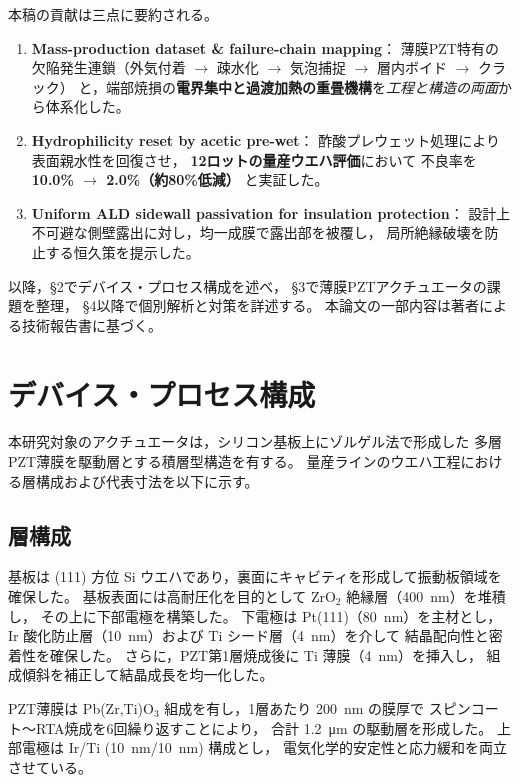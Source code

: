 \documentclass[conference]{IEEEtran}
\begin{document}
本稿の貢献は三点に要約される。
\begin{enumerate}
  \item \textbf{Mass-production dataset \& failure-chain mapping}：  
  薄膜PZT特有の欠陥発生連鎖（外気付着 $\rightarrow$ 疎水化 $\rightarrow$ 気泡捕捉 $\rightarrow$ 層内ボイド $\rightarrow$ クラック）
  と，端部焼損の\textbf{電界集中と過渡加熱の重畳機構}を\emph{工程と構造の両面}から体系化した。
  \item \textbf{Hydrophilicity reset by acetic pre-wet}：  
  酢酸プレウェット処理により表面親水性を回復させ，
  \textbf{12ロットの量産ウエハ評価}において
  不良率を \textbf{10.0\% $\rightarrow$ 2.0\%（約80\%低減）} と実証した。
  \item \textbf{Uniform ALD sidewall passivation for insulation protection}：  
  設計上不可避な側壁露出に対し，均一成膜で露出部を被覆し，
  局所絶縁破壊を防止する恒久策を提示した。
\end{enumerate}

以降，\S2でデバイス・プロセス構成を述べ，
\S3で薄膜PZTアクチュエータの課題を整理，
\S4以降で個別解析と対策を詳述する。
本論文の一部内容は著者による技術報告書\cite{Samizo2025}に基づく。

\section{デバイス・プロセス構成}
本研究対象のアクチュエータは，シリコン基板上にゾルゲル法で形成した
多層PZT薄膜を駆動層とする積層型構造を有する。
量産ラインのウエハ工程における層構成および代表寸法を以下に示す。

\subsection{層構成}
基板は (111) 方位 Si ウエハであり，裏面にキャビティを形成して振動板領域を確保した。
基板表面には高耐圧化を目的として ZrO$_2$ 絶縁層（\SI{400}{nm}）を堆積し，
その上に下部電極を構築した。
下電極は Pt(111)（\SI{80}{nm}）を主材とし，
Ir 酸化防止層（\SI{10}{nm}）および Ti シード層（\SI{4}{nm}）を介して
結晶配向性と密着性を確保した。
さらに，PZT第1層焼成後に Ti 薄膜（\SI{4}{nm}）を挿入し，
組成傾斜を補正して結晶成長を均一化した。

PZT薄膜は Pb(Zr,Ti)O$_3$ 組成を有し，1層あたり \SI{200}{nm} の膜厚で
スピンコート〜RTA焼成を6回繰り返すことにより，
合計 \SI{1.2}{\micro\metre} の駆動層を形成した。
上部電極は Ir/Ti (\SI{10}{nm}/\SI{10}{nm}) 構成とし，
電気化学的安定性と応力緩和を両立させている。
\end{document}
